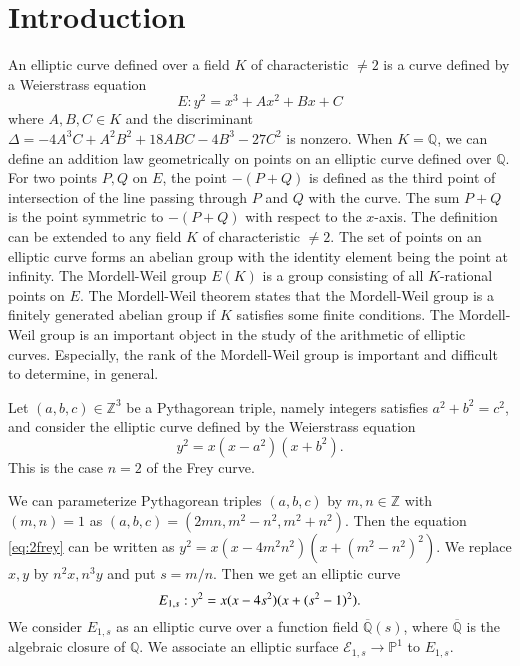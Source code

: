 \documentclass[a4paper]{jarticle} %
\theoremstyle{definition}
\theoremstyle{remark}
\begin{document}
\section{Introduction}
An elliptic curve defined over a field $K$ of characteristic $\neq 2$ is a curve defined by a Weierstrass equation
\begin{equation*}
    E: y^{2} = x^{3} + Ax^2 + Bx + C
\end{equation*}
where $A,B,C \in K$ and the discriminant $\Delta = -4A^3C + A^2B^2 + 18ABC - 4B^3 - 27C^2$ is nonzero.
When $K=\mathbb{Q}$, we can define an addition law geometrically on points on an elliptic curve defined over $\mathbb{Q}$.
For two points $P,Q$ on $E$, the point $-(P+Q)$ is defined as the third point of intersection of the line passing through $P$ and $Q$ with the curve.
The sum $P+Q$ is the point symmetric to $-(P+Q)$ with respect to the $x$-axis.
The definition can be extended to any field $K$ of characteristic $\neq 2$.
The set of points on an elliptic curve forms an abelian group with the identity element being the point at infinity.
The Mordell-Weil group $E(K)$ is a group consisting of all $K$-rational points on $E$.
The Mordell-Weil theorem states that the Mordell-Weil group is a finitely generated abelian group if $K$ satisfies some finite conditions.
The Mordell-Weil group is an important object in the study of the arithmetic of elliptic curves.
Especially, the rank of the Mordell-Weil group is important and difficult to determine, in general.

Let $(a,b,c) \in \mathbb{Z}^3$ be a Pythagorean triple, namely integers satisfies $a^{2} + b^{2} = c^{2}$, and consider the elliptic curve defined by the Weierstrass equation
\begin{equation}
    \label{eq:2frey}
    y^{2} = x(x - a^{2})(x + b^{2}).
\end{equation}
This is the case $n=2$ of the Frey curve.

We can parameterize Pythagorean triples $(a,b,c)$ by $m,n \in \mathbb{Z}$ with $(m,n)=1$ as $(a,b,c) = (2mn, m^{2} - n^{2}, m^{2} + n^{2})$.
Then the equation \eqref{eq:2frey} can be written as $y^{2} = x(x - 4m^2n^2)(x + (m^{2} - n^2)^{2})$.
We replace $x,y$ by $n^2x, n^3y$ and put $s = m/n$.
Then we get an elliptic curve
\begin{equation*}
    \label{eq:E_{1,s}}
    E_{1,s}: y^{2} = x(x - 4s^{2})(x + (s^{2} - 1)^{2}).
\end{equation*}
We consider $E_{1,s}$ as an elliptic curve over a function field $\overline{\mathbb{Q}}(s)$, where $\overline{\mathbb{Q}}$ is the algebraic closure of $\mathbb{Q}$.
We associate an elliptic surface $\mathcal{E}_{1,s} \to \mathbb{P}^1$ to $E_{1,s}$.
\end{document}
